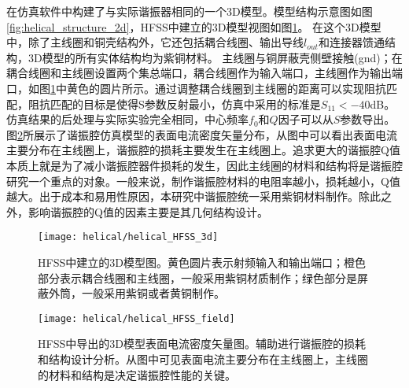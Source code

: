 在仿真软件中构建了与实际谐振器相同的一个3D模型。模型结构示意图如图\ref{fig:helical_structure_2d}，HFSS中建立的3D模型视图如图\ref{fig:helical_HFSS_3d}。
在这个3D模型中，除了主线圈和铜壳结构外，它还包括耦合线圈、输出导线$l_{out}$和连接器馈通结构，3D模型的所有实体结构均为紫铜材料。
主线圈与铜屏蔽壳侧壁接触(gnd)；在耦合线圈和主线圈设置两个集总端口，耦合线圈作为输入端口，主线圈作为输出端口，如图\ref{fig:helical_HFSS_3d}中黄色的圆片所示。通过调整耦合线圈到主线圈的距离可以实现阻抗匹配，阻抗匹配的目标是使得S参数反射最小，仿真中采用的标准是$S_{11}<-40$dB。仿真结果的后处理与实际实验完全相同，中心频率$f_0$和$Q$因子可以从$S$参数导出。图\ref{fig:helical_HFSS_field}所展示了谐振腔仿真模型的表面电流密度矢量分布，从图中可以看出表面电流主要分布在主线圈上，谐振腔的损耗主要发生在主线圈上。追求更大的谐振腔Q值本质上就是为了减小谐振腔器件损耗的发生，因此主线圈的材料和结构将是谐振腔研究一个重点的对象。一般来说，制作谐振腔材料的电阻率越小，损耗越小，Q值越大。出于成本和易用性原因，本研究中谐振腔统一采用紫铜材料制作。除此之外，影响谐振腔的Q值的因素主要是其几何结构设计。

\begin{figure}
    \centering
    \texttt{[image: helical/helical\_HFSS\_3d]}
    \caption[HFSS中建立的3D模型图]{HFSS中建立的3D模型图。黄色圆片表示射频输入和输出端口；橙色部分表示耦合线圈和主线圈，一般采用紫铜材质制作；绿色部分是屏蔽外筒，一般采用紫铜或者黄铜制作。\label{fig:helical_HFSS_3d}}
\end{figure}

\begin{figure}
    \centering
    \texttt{[image: helical/helical\_HFSS\_field]}
    \caption[HFSS中导出的3D模型表面电流密度矢量图]{HFSS中导出的3D模型表面电流密度矢量图。辅助进行谐振腔的损耗和结构设计分析。从图中可见表面电流主要分布在主线圈上，主线圈的材料和结构是决定谐振腔性能的关键。\label{fig:helical_HFSS_field}}
\end{figure}


